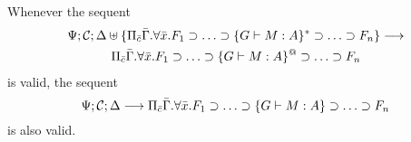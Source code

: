 \documentclass[11pt]{article}
\begin{document}
\begin{theorem}
Whenever the sequent
%
\begin{gather*}
\Psi;\mathcal{C};\Delta\uplus\{\Pi_{\bar{c}}\bar{\Gamma}.\forall \bar{x}. F_1\supset \ldots\supset \{G \vdash M:A\}^*\supset \ldots\supset F_n\}\longrightarrow\\
    {\Pi_{\bar{c}}\bar{\Gamma}.\forall \bar{x}. F_1\supset \ldots\supset \{G \vdash M:A\}^@\supset \ldots\supset F_n}
\end{gather*}
%
is valid, the sequent
%
\[
\Psi;\mathcal{C};\Delta\longrightarrow \Pi_{\bar{c}}\bar{\Gamma}.\forall \bar{x}. F_1\supset \ldots\supset \{G \vdash M:A\}\supset \ldots\supset F_n
\]
% 
is also valid.
\end{theorem}
\end{document}
